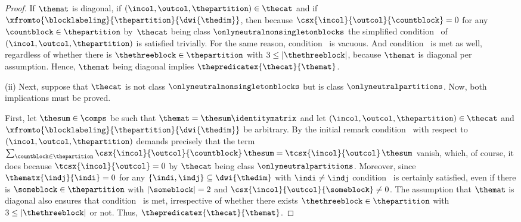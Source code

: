 \documentclass[pdftex]{sigma}
\numberwithin{equation}{section}
\begin{document}
{\begin{proof}
    If $\themat$ is diagonal, if $(\incol,\outcol,\thepartition)\in\thecat$ and if $\xfromto{\blocklabeling}{\thepartition}{\dwi{\thedim}}$, then because  $\csx{\incol}{\outcol}{\countblock}=0$ for any $\countblock\in\thepartition$ by~$\thecat$ being class $\onlyneutralnonsingletonblocks$ the simplified con\-di\-tion~\conditionone{} of $(\incol,\outcol,\thepartition)$ is satisfied trivially. For the same reason, con\-di\-tion~\conditiontwo{} is vacuous. And con\-di\-tion~\conditionthree{} is met as well, regardless of whether there is $\thethreeblock\in\thepartition$ with $3\leq|\thethreeblock|$, because $\themat$ is diagonal per assumption. Hence, $\themat$ being diagonal implies $\thepredicatex{\thecat}{\themat}$.

    (ii)
 Next, suppose that $\thecat$ is not class $\onlyneutralnonsingletonblocks$ but is class $\onlyneutralpartitions$. Now, both implications must be proved.

First, let  $\thesum\in\comps$ be such that $\themat=\thesum\identitymatrix$ and let $(\incol,\outcol,\thepartition)\in\thecat$ and $\xfromto{\blocklabeling}{\thepartition}{\dwi{\thedim}}$ be arbitrary. By the initial remark  con\-di\-tion~\conditionone{} with respect to $(\incol,\outcol,\thepartition)$ demands precisely that the term $\sum_{\countblock\in\thepartition}\csx{\incol}{\outcol}{\countblock}\,\thesum=\tcsx{\incol}{\outcol}\,\thesum$ vanish, which, of course, it does because $\tcsx{\incol}{\outcol}=0$ by $\thecat$ being class $\onlyneutralpartitions$. Moreover, since $\thematx{\indj}{\indi}=0$ for any $\{\indi,\indj\}\subseteq \dwi{\thedim}$ with $\indi\neq \indj$ con\-di\-tion~\conditiontwo{} is certainly satisfied, even if there is $\someblock\in\thepartition$  with $|\someblock|=2$ and $\csx{\incol}{\outcol}{\someblock}\neq 0$. The assumption that $\themat$ is diagonal also ensures that con\-di\-tion~\conditionthree{} is met, irrespective of whether there exists $\thethreeblock\in\thepartition$ with $3\leq|\thethreeblock|$ or not. Thus, $\thepredicatex{\thecat}{\themat}$.


\end{proof}}
\end{document}
